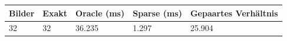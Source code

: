 \begin{tabular}{lllll}
\hline
Bilder & Exakt & Oracle (ms) & Sparse (ms) & Gepaartes Verhältnis \\
\hline
32 & 32 & 36.235 & 1.297 & 25.904 \\
\hline
\end{tabular}
